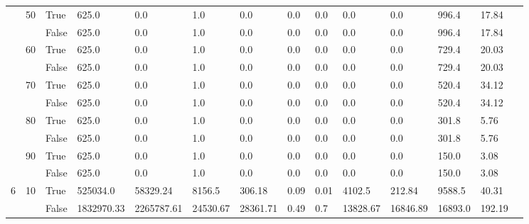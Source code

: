 \begin{landscape}
\begin{small}
\begin{longtable}[c]{@{}lll|ll|ll|ll|ll|lll@{}}
   & 50 & True  & 625.0           & 0.0            & 1.0           & 0.0           & 0.0           & 0.0           & 0.0           & 0.0           & 996.4         & 17.84       &  \\
   &    & False & 625.0           & 0.0            & 1.0           & 0.0           & 0.0           & 0.0           & 0.0           & 0.0           & 996.4         & 17.84       &  \\
   & 60 & True  & 625.0           & 0.0            & 1.0           & 0.0           & 0.0           & 0.0           & 0.0           & 0.0           & 729.4         & 20.03       &  \\
   &    & False & 625.0           & 0.0            & 1.0           & 0.0           & 0.0           & 0.0           & 0.0           & 0.0           & 729.4         & 20.03       &  \\
   & 70 & True  & 625.0           & 0.0            & 1.0           & 0.0           & 0.0           & 0.0           & 0.0           & 0.0           & 520.4         & 34.12       &  \\
   &    & False & 625.0           & 0.0            & 1.0           & 0.0           & 0.0           & 0.0           & 0.0           & 0.0           & 520.4         & 34.12       &  \\
   & 80 & True  & 625.0           & 0.0            & 1.0           & 0.0           & 0.0           & 0.0           & 0.0           & 0.0           & 301.8         & 5.76        &  \\
   &    & False & 625.0           & 0.0            & 1.0           & 0.0           & 0.0           & 0.0           & 0.0           & 0.0           & 301.8         & 5.76        &  \\
   & 90 & True  & 625.0           & 0.0            & 1.0           & 0.0           & 0.0           & 0.0           & 0.0           & 0.0           & 150.0         & 3.08        &  \\
   &    & False & 625.0           & 0.0            & 1.0           & 0.0           & 0.0           & 0.0           & 0.0           & 0.0           & 150.0         & 3.08        &  \\
  \midrule
6  & 10 & True  & 525034.0        & 58329.24       & 8156.5        & 306.18        & 0.09          & 0.01          & 4102.5        & 212.84        & 9588.5        & 40.31       &  \\
   &    & False & 1832970.33      & 2265787.61     & 24530.67      & 28361.71      & 0.49          & 0.7           & 13828.67      & 16846.89      & 16893.0       & 192.19      &  \\

\end{longtable}
\end{small}
\end{landscape}
